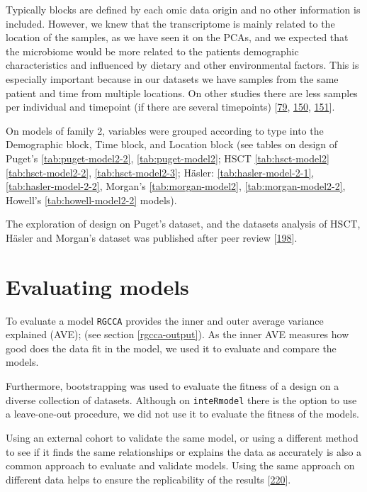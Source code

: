 \documentclass[
  12pt,
  a4paper,
  twoside,
  openright]{book}
\begin{document}
Typically blocks are defined by each omic data origin and no other information is included.
However, we knew that the transcriptome is mainly related to the location of the samples, as we have seen it on the PCAs, and we expected that the microbiome would be more related to the patients demographic characteristics and influenced by dietary and other environmental factors.
This is especially important because in our datasets we have samples from the same patient and time from multiple locations.
On other studies there are less samples per individual and timepoint (if there are several timepoints) {[}\protect\hyperlink{ref-hasler_uncoupling_2016}{79}, \protect\hyperlink{ref-morgan2015}{150}, \protect\hyperlink{ref-howell2018}{151}{]}.

On models of family 2, variables were grouped according to type into the Demographic block, Time block, and Location block (see tables on design of Puget's \ref{tab:puget-model2-2}, \ref{tab:puget-model2}; HSCT \ref{tab:hsct-model2} \ref{tab:hsct-model2-2}, \ref{tab:hsct-model2-3}; Häsler: \ref{tab:hasler-model-2-1}, \ref{tab:hasler-model-2-2}, Morgan's \ref{tab:morgan-model2}, \ref{tab:morgan-model2-2}, Howell's \ref{tab:howell-model2-2} models).

The exploration of design on Puget's dataset, and the datasets analysis of HSCT, Häsler and Morgan's dataset was published after peer review {[}\protect\hyperlink{ref-revilla2021}{198}{]}.

\hypertarget{evaluating-models}{%
\section{Evaluating models}\label{evaluating-models}}

To evaluate a model \texttt{RGCCA} provides the inner and outer average variance explained (AVE); (see section \ref{rgcca-output}).
As the inner AVE measures how good does the data fit in the model, we used it to evaluate and compare the models.

Furthermore, bootstrapping was used to evaluate the fitness of a design on a diverse collection of datasets.
Although on \texttt{inteRmodel} there is the option to use a leave-one-out procedure, we did not use it to evaluate the fitness of the models.

Using an external cohort to validate the same model, or using a different method to see if it finds the same relationships or explains the data as accurately is also a common approach to evaluate and validate models.
Using the same approach on different data helps to ensure the replicability of the results {[}\protect\hyperlink{ref-community2021}{220}{]}.
\end{document}
